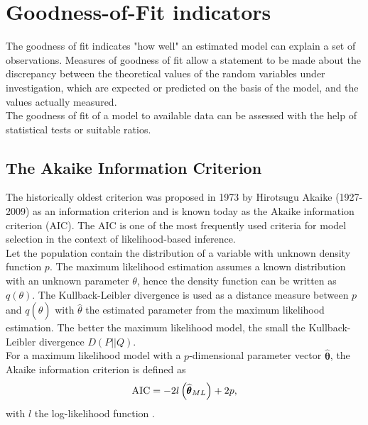 \section{Goodness-of-Fit indicators}\label{sec:performance}
The goodness of fit indicates "how well" an estimated model can explain a set of observations. Measures of goodness of fit allow a statement to be made about the discrepancy between the theoretical values of the random variables under investigation, which are expected or predicted on the basis of the model, and the values actually measured. \\
The goodness of fit of a model to available data can be assessed with the help of statistical tests or suitable ratios.
\subsection{The Akaike Information Criterion}
The historically oldest criterion was proposed in 1973 by Hirotsugu Akaike (1927-2009) as an information criterion and is known today as the Akaike information criterion (AIC). The AIC is one of the most frequently used criteria for model selection in the context of likelihood-based inference.  \\
Let the population contain the distribution of a variable with unknown density function $p$. The maximum likelihood estimation assumes a known distribution with an unknown parameter $\theta$, hence the density function can be written as $q\left(\theta\right)$. The Kullback-Leibler divergence is used as a distance measure between $p$ and $q\left(\widehat{\theta}\right)$ with $\widehat{\theta}$ the estimated parameter from the maximum likelihood estimation. The better the maximum likelihood model, the small the Kullback-Leibler divergence $D\left(P||Q\right)$. \\
For a maximum likelihood model with a $p$-dimensional parameter vector $\widehat{\pmb{\theta}}$, the Akaike information criterion is defined as
\begin{equation}
    \hbox{AIC}=-2l\left(\widehat{\pmb{\theta}}_{ML}\right)+2p,
\end{equation}
with $l$ the log-likelihood function \autocite[][]{akaike1974new}.

